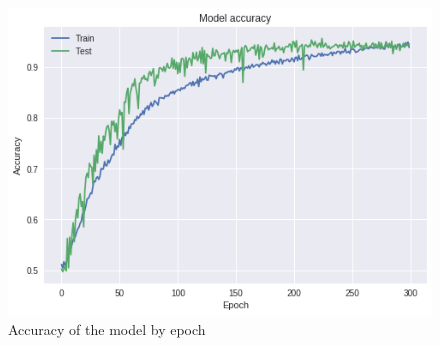 \documentclass[a4paper]{article}
\begin{document}
\begin{figure}[h!]
	\centering
	\includegraphics[scale=.6]{VGGAccu_of2.png}
	\caption{Accuracy of the model by epoch}
	\label{fig:vggacc}
\end{figure}

\newpage
\end{document}

